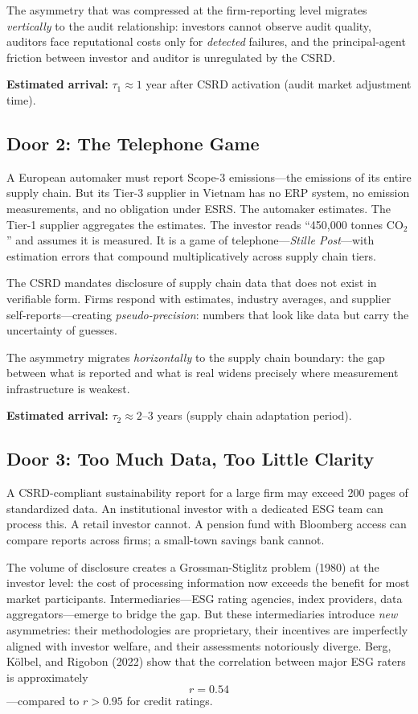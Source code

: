 \documentclass[12pt,a4paper]{article}
\begin{document}
The asymmetry that was compressed at the firm-reporting level migrates \textit{vertically} to the audit relationship: investors cannot observe audit quality, auditors face reputational costs only for \textit{detected} failures, and the principal-agent friction between investor and auditor is unregulated by the CSRD.

\textbf{Estimated arrival:} $\tau_1 \approx 1$ year after CSRD activation (audit market adjustment time).

\subsection{Door 2: The Telephone Game}

A European automaker must report Scope-3 emissions---the emissions of its entire supply chain. But its Tier-3 supplier in Vietnam has no ERP system, no emission measurements, and no obligation under ESRS. The automaker estimates. The Tier-1 supplier aggregates the estimates. The investor reads ``450,000 tonnes CO$_2$'' and assumes it is measured. It is a game of telephone---\textit{Stille Post}---with estimation errors that compound multiplicatively across supply chain tiers.

The CSRD mandates disclosure of supply chain data that does not exist in verifiable form. Firms respond with estimates, industry averages, and supplier self-reports---creating \textit{pseudo-precision}: numbers that look like data but carry the uncertainty of guesses.

The asymmetry migrates \textit{horizontally} to the supply chain boundary: the gap between what is reported and what is real widens precisely where measurement infrastructure is weakest.

\textbf{Estimated arrival:} $\tau_2 \approx 2$--$3$ years (supply chain adaptation period).

\subsection{Door 3: Too Much Data, Too Little Clarity}

A CSRD-compliant sustainability report for a large firm may exceed 200 pages of standardized data. An institutional investor with a dedicated ESG team can process this. A retail investor cannot. A pension fund with Bloomberg access can compare reports across firms; a small-town savings bank cannot.

The volume of disclosure creates a Grossman-Stiglitz problem (1980) at the investor level: the cost of processing information now exceeds the benefit for most market participants. Intermediaries---ESG rating agencies, index providers, data aggregators---emerge to bridge the gap. But these intermediaries introduce \textit{new} asymmetries: their methodologies are proprietary, their incentives are imperfectly aligned with investor welfare, and their assessments notoriously diverge. Berg, K\"olbel, and Rigobon (2022) show that the correlation between major ESG raters is approximately $$r = 0.54$$---compared to $r > 0.95$ for credit ratings.
\end{document}
